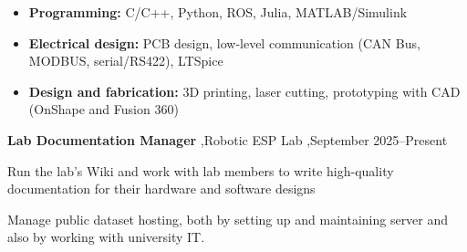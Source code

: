 \documentclass[letterpaper,10pt]{article}
\newenvironment{cvdetails}
  {%
    \begin{list}{\textbullet}{%
      \setlength{\leftmargin}{1.3em}%
      \setlength{\rightmargin}{0pt}%
      \setlength{\labelwidth}{0.6em}%
      \setlength{\labelsep}{0.4em}%
      \setlength{\itemindent}{0pt}%
      \setlength{\listparindent}{0pt}%
      \setlength{\topsep}{3pt}%
      \setlength{\partopsep}{0pt}%
      \setlength{\itemsep}{2pt}%
      \setlength{\parsep}{0pt}%
    }%
  }
  {\end{list}}
\begin{document}


\begin{itemize}

\item
  \textbf{Programming:}
  C/C++, Python, ROS, Julia, MATLAB/Simulink

\item
  \textbf{Electrical design:}
  PCB design, low-level communication (CAN Bus, MODBUS, serial/RS422), LTSpice 

\item
  \textbf{Design and fabrication:}
  3D printing, laser cutting, prototyping with CAD (OnShape and Fusion 360)

\end{itemize}



\begin{itemize}

\item
  \textbf{Lab Documentation Manager}
  \sep Robotic ESP Lab \sep September 2025--Present


  \begin{cvdetails}
    \item  Run the lab's Wiki and work with lab members to write high-quality documentation for their hardware and software designs
    \item Manage public dataset hosting, both by setting up and maintaining server and also by working with university IT.
  \end{cvdetails} 

\end{itemize}
\end{document}
